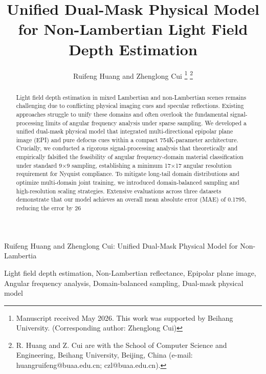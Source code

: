 \documentclass[lettersize,journal]{IEEEtran}
\begin{document}
\title{Unified Dual-Mask Physical Model for Non-Lambertian Light Field Depth Estimation}

\author{Ruifeng Huang and Zhenglong Cui
\thanks{Manuscript received May 2026. This work was supported by Beihang University. (Corresponding author: Zhenglong Cui)}
\thanks{R. Huang and Z. Cui are with the School of Computer Science and Engineering, Beihang University, Beijing, China (e-mail: huangruifeng@buaa.edu.cn; czl@buaa.edu.cn).}}

%
{Ruifeng Huang and Zhenglong Cui: Unified Dual-Mask Physical Model for Non-Lambertia}

\maketitle

\begin{abstract}
Light field depth estimation in mixed Lambertian and non-Lambertian scenes remains challenging due to conflicting physical imaging cues and specular reflections. Existing approaches struggle to unify these domains and often overlook the fundamental signal-processing limits of angular frequency analysis under sparse sampling. We developed a unified dual-mask physical model that integrated multi-directional epipolar plane image (EPI) and pure defocus cues within a compact 754K-parameter architecture. Crucially, we conducted a rigorous signal-processing analysis that theoretically and empirically falsified the feasibility of angular frequency-domain material classification under standard 9×9 sampling, establishing a minimum 17×17 angular resolution requirement for Nyquist compliance. To mitigate long-tail domain distributions and optimize multi-domain joint training, we introduced domain-balanced sampling and high-resolution scaling strategies. Extensive evaluations across three datasets demonstrate that our model achieves an overall mean absolute error (MAE) of 0.1795, reducing the error by 26%
\end{abstract}

\begin{IEEEkeywords}
Light field depth estimation, Non-Lambertian reflectance, Epipolar plane image, Angular frequency analysis, Domain-balanced sampling, Dual-mask physical model
\end{IEEEkeywords}
\end{document}
